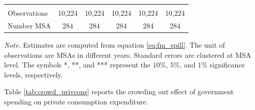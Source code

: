 \documentclass[dv_diss_main.tex]{subfiles}
\begin{document}
\begin{table}[H]
\begin{center}
{\begin{tabular}{lccccc}
    \vspace{4pt} & \begin{footnotesize}\end{footnotesize} & \begin{footnotesize}\end{footnotesize} & \begin{footnotesize}\end{footnotesize} & \begin{footnotesize}\end{footnotesize} & \begin{footnotesize}\end{footnotesize} \\
    Observations & 10,224 & 10,224 & 10,224 & 10,224 & 10,224 \\
    Number MSA & 284 & 284 & 284 & 284 & 284 \\
    \hline
    \end{tabular}
    }
    \label{tab:earn_spill}
    \end{center}
       
    \footnotesize{\textit{Note. }Estimates are computed from  equation \eqref{eq:fm_spill}. The unit of observations are MSAs in different years. Standard errors are clustered at MSA level. The symbols *, **, and *** represent the $10\%$, $5\%$, and $1\%$ significance levels, respectively.}

\end{table}

\newpage
Table \ref{tab:crowd_privcons} reports the crowding out effect of government spending on private consumption expenditure.
\end{document}
